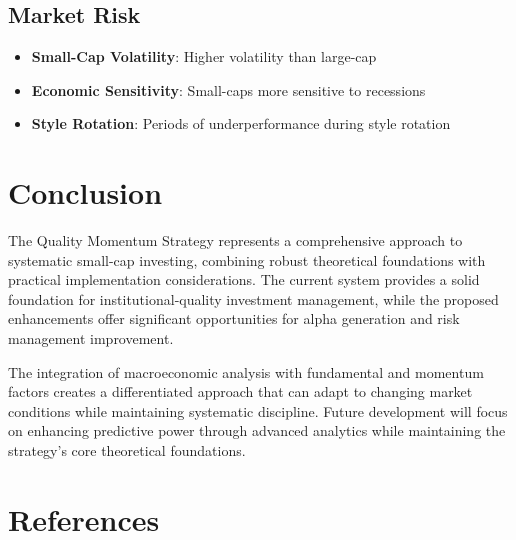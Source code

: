 \documentclass[12pt,a4paper]{article}
\begin{document}
\subsection{Market Risk}
\begin{itemize}
    \item \textbf{Small-Cap Volatility}: Higher volatility than large-cap
    \item \textbf{Economic Sensitivity}: Small-caps more sensitive to recessions
    \item \textbf{Style Rotation}: Periods of underperformance during style rotation
\end{itemize}

\section{Conclusion}

The Quality Momentum Strategy represents a comprehensive approach to systematic small-cap investing, combining robust theoretical foundations with practical implementation considerations. The current system provides a solid foundation for institutional-quality investment management, while the proposed enhancements offer significant opportunities for alpha generation and risk management improvement.

The integration of macroeconomic analysis with fundamental and momentum factors creates a differentiated approach that can adapt to changing market conditions while maintaining systematic discipline. Future development will focus on enhancing predictive power through advanced analytics while maintaining the strategy's core theoretical foundations.

\section{References}
\end{document}
